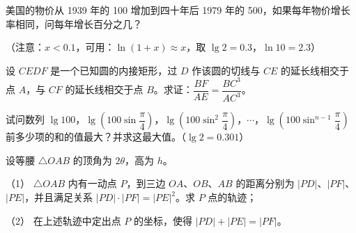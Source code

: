 \begin{question}
美国的物价从 1939 年的 100 增加到四十年后 1979 年的 500，如果每年物价增长率相同，问每年增长百分之几？

（注意：$x<0.1$，可用：$\ln(1+x)\approx x$，取 $\lg2=0.3$，$\ln10=2.3$）

\Needspace{0.4\textheight}
\end{question}
\begin{question}
设 $CEDF$ 是一个已知圆的内接矩形，过 $D$ 作该圆的切线与 $CE$ 的延长线相交于点 $A$，与 $CF$ 的延长线相交于点 $B$。求证：$\dfrac{BF}{AE}=\dfrac{BC^3}{AC^3}$。
\nopagebreak[4]
\begin{center}\end{center}
\nopagebreak[4]
\end{question}
\begin{question}
试问数列 $\lg100$，$\lg\left(100\sin\dfrac{\pi}{4}\right)$，$\lg\left(100\sin^2\dfrac{\pi}{4}\right)$，$\cdots$，$\lg\left(100\sin^{n-1}\dfrac{\pi}{4}\right)$ 前多少项的和的值最大？并求这最大值。（$\lg2=0.301$）

\end{question}
\begin{question}
设等腰 $\triangle OAB$ 的顶角为 $2\theta$，高为 $h$。

（1） $\triangle OAB$ 内有一动点 $P$，到三边 $OA$、$OB$、$AB$ 的距离分别为 $|PD|$、$|PF|$、$|PE|$，并且满足关系 $|PD|\cdot|PF|=|PE|^2$。求 $P$ 点的轨迹；

（2） 在上述轨迹中定出点 $P$ 的坐标，使得 $|PD|+|PE|=|PF|$。

\end{question}